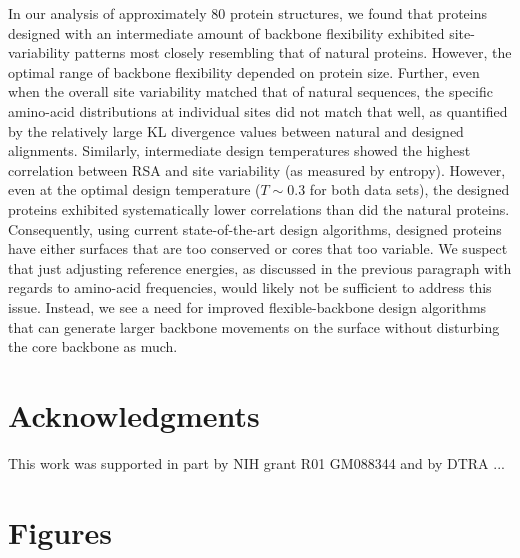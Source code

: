 \documentclass[12pt]{article}
\begin{document}
In our analysis of approximately 80 protein structures, we found that proteins designed with an intermediate amount of backbone flexibility exhibited site-variability patterns most closely resembling that of natural proteins.  However, the optimal range of backbone flexibility depended on protein size. Further, even when the overall site variability matched that of natural sequences, the specific amino-acid distributions at individual sites did not match that well, as quantified by the relatively large KL divergence values between natural and designed alignments. Similarly, intermediate design temperatures showed the highest correlation between RSA and site variability (as measured by entropy). However, even at the optimal design temperature ($T \sim 0.3$ for both data sets), the designed proteins exhibited systematically lower correlations than did the natural proteins. Consequently, using current state-of-the-art design algorithms, designed proteins have either surfaces that are too conserved or cores that too variable. We suspect that just adjusting reference energies, as discussed in the previous paragraph with regards to amino-acid frequencies, would likely not be sufficient to address this issue. Instead, we see a need for improved flexible-backbone design algorithms that can generate larger backbone movements on the surface without disturbing the core backbone as much.



\section{Acknowledgments}

This work was supported in part by NIH grant R01 GM088344 and by {\color{red}DTRA ...}


\cleardoublepage

\section{Figures}
\end{document}
